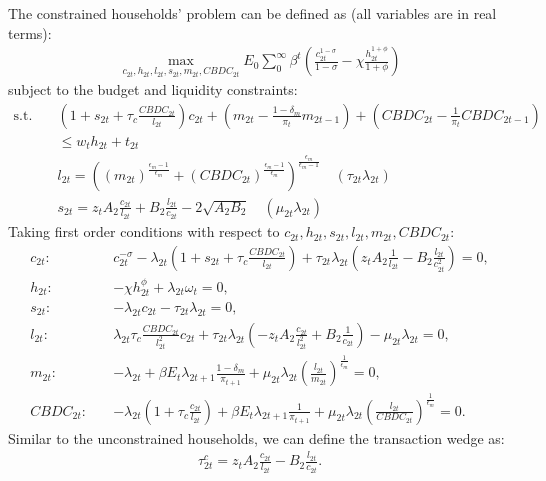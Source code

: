 \documentclass[12pt]{article}
\begin{document}
The constrained households' problem can be defined as (all variables are in real terms):
\begin{align*}
\max_{c_{2t}, h_{2t},l_{2t},s_{2t},m_{2t},CBDC_{2t}} E_0 \sum_0^{\infty}\beta^t (\frac{c_{2t}^{1-\sigma}}{1-\sigma}-\chi\frac{h_{2t}^{1+\phi}}{1+\phi})
\end{align*}
subject to the budget and liquidity constraints:
\begin{align*} 
\text{s.t.} \quad & (1+s_{2t}+\tau_c\frac{CBDC_{2t}}{l_{2t}})c_{2t}+(m_{2t}-\frac{1-\delta_m}{\pi_t}m_{2t-1})+(CBDC_{2t}-\frac{1}{\pi_t}CBDC_{2t-1}) \\
&\leq w_th_{2t}+t_{2t}\\
&l_{2t} = ((m_{2t})^{\frac{\epsilon_m-1}{\epsilon_m}}+(CBDC_{2t})^{\frac{\epsilon_m-1}{\epsilon_m}})^{\frac{\epsilon_m}{\epsilon_m-1}}  \quad (\tau_{2t}\lambda_{2t})\\
& s_{2t} = z_tA_2\frac{c_{2t}}{l_{2t}}+B_2\frac{l_{2t}}{c_{2t}}-2\sqrt{A_2B_2} \quad (\mu_{2t}\lambda_{2t})
\end{align*}
Taking first order conditions with respect to $c_{2t}, h_{2t}, s_{2t}, l_{2t}, m_{2t}, CBDC_{2t}$: 
\begin{align}
\label{c2}
c_{2t}: \quad &c_{2t}^{-\sigma}-\lambda_{2t}(1+s_{2t}+\tau_c\frac{CBDC_{2t}}{l_{2t}})+\tau_{2t}\lambda_{2t}(z_tA_2\frac{1}{l_{2t}}-B_2\frac{l_{2t}}{c_{2t}^2}) = 0, \\
\label{h2}
h_{2t}: \quad &-\chi h_{2t}^{\phi}+\lambda_{2t}\omega_t  = 0, \\
\label{s2}
s_{2t}: \quad &-\lambda_{2t}c_{2t}-\tau_{2t}\lambda_{2t} = 0, \\
\label{l2}
l_{2t}: \quad &\lambda_{2t}\tau_c\frac{CBDC_{2t}}{l_{2t}^2}c_{2t}+\tau_{2t}\lambda_{2t}(-z_tA_2\frac{c_{2t}}{l_{2t}^2}+B_2\frac{1}{c_{2t}})-\mu_{2t}\lambda_{2t} = 0, \\
\label{m2}
m_{2t}: \quad &-\lambda_{2t}+\beta E_t\lambda_{2t+1}\frac{1-\delta_m}{\pi_{t+1}}+\mu_{2t} \lambda_{2t}(\frac{l_{2t}}{m_{2t}})^{\frac{1}{\epsilon_m}}= 0, \\
\label{CBDC2}
CBDC_{2t}: \quad &-\lambda_{2t}(1+\tau_c\frac{c_{2t}}{l_{2t}})+\beta E_t\lambda_{2t+1}\frac{1}{\pi_{t+1}}+\mu_{2t} \lambda_{2t}(\frac{l_{2t}}{CBDC_{2t}})^{\frac{1}{\epsilon_m}}= 0.
\end{align}
Similar to the unconstrained households, we can define the transaction wedge as:
\begin{align}
\label{tau2c}
\tau_{2t}^c = z_tA_2\frac{c_{2t}}{l_{2t}}-B_2\frac{l_{2t}}{c_{2t}}.
\end{align}
\end{document}
